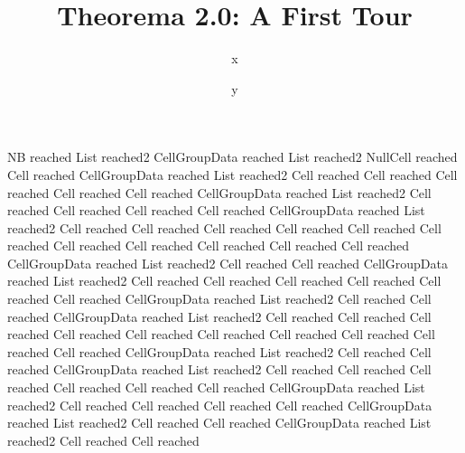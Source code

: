 \documentclass{article}
\begin{document}
% 

\title{Theorema 2.0: A First Tour}
\author{x}
\date{y}
\maketitle

NB reached List reached2 CellGroupData reached List reached2 NullCell reached Cell reached CellGroupData reached List reached2 Cell reached Cell reached Cell reached Cell reached Cell reached CellGroupData reached List reached2 Cell reached Cell reached Cell reached Cell reached CellGroupData reached List reached2 Cell reached Cell reached Cell reached Cell reached Cell reached Cell reached Cell reached Cell reached Cell reached Cell reached Cell reached CellGroupData reached List reached2 Cell reached Cell reached CellGroupData reached List reached2 Cell reached Cell reached Cell reached Cell reached Cell reached Cell reached CellGroupData reached List reached2 Cell reached Cell reached CellGroupData reached List reached2 Cell reached Cell reached Cell reached Cell reached Cell reached Cell reached Cell reached Cell reached Cell reached Cell reached CellGroupData reached List reached2 Cell reached Cell reached CellGroupData reached List reached2 Cell reached Cell reached Cell reached Cell reached Cell reached Cell reached CellGroupData reached List reached2 Cell reached Cell reached Cell reached Cell reached CellGroupData reached List reached2 Cell reached Cell reached CellGroupData reached List reached2 Cell reached Cell reached 
\end{document}
